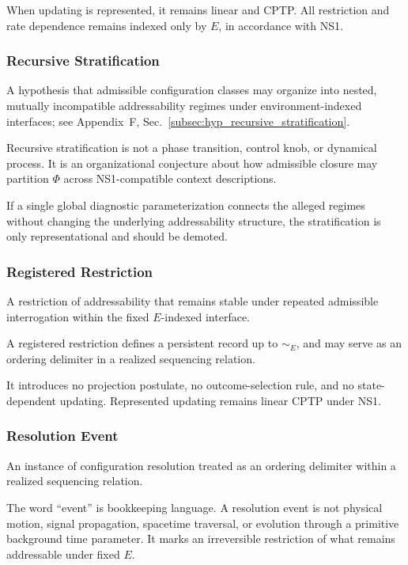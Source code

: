 \documentclass[aps,prx,onecolumn,11pt]{revtex4-2}
\theoremstyle{plain}
\theoremstyle{definition}
\theoremstyle{remark}
\begin{document}
When updating is represented, it remains linear and CPTP. All
restriction and rate dependence remains indexed only by \(E\), in
accordance with NS1.

\subsubsection*{Recursive Stratification}

A hypothesis that admissible configuration classes may organize into
nested, mutually incompatible addressability regimes under
environment-indexed interfaces; see Appendix~F,
Sec.~\ref{subsec:hyp_recursive_stratification}.

Recursive stratification is not a phase transition, control knob, or
dynamical process. It is an organizational conjecture about how
admissible closure may partition \(\Phi\) across NS1-compatible context
descriptions.

If a single global diagnostic parameterization connects the alleged
regimes without changing the underlying addressability structure, the
stratification is only representational and should be demoted.

\subsubsection*{Registered Restriction}
\label{gloss:registered_restriction}

A restriction of addressability that remains stable under repeated
admissible interrogation within the fixed \(E\)-indexed interface.

A registered restriction defines a persistent record up to
\(\sim_E\), and may serve as an ordering delimiter in a realized
sequencing relation.

It introduces no projection postulate, no outcome-selection rule, and
no state-dependent updating. Represented updating remains linear CPTP
under NS1.

\subsubsection*{Resolution Event}
\label{gloss:resolution_event}

An instance of configuration resolution treated as an ordering delimiter
within a realized sequencing relation.

The word ``event'' is bookkeeping language. A resolution event is not
physical motion, signal propagation, spacetime traversal, or evolution
through a primitive background time parameter. It marks an irreversible
restriction of what remains addressable under fixed \(E\).
\end{document}
